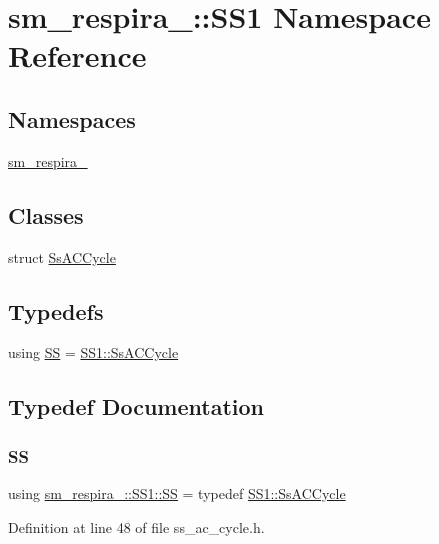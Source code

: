 \hypertarget{namespacesm__respira__1_1_1SS1}{}\section{sm\+\_\+respira\+\_\+:\+:S\+S1 Namespace Reference}
\label{namespacesm__respira__1_1_1SS1}
\subsection*{Namespaces}
\begin{DoxyCompactItemize}
\item 
 \hyperlink{namespacesm__respira__1_1_1SS1_1_1sm__respira__1}{sm\+\_\+respira\+\_}
\end{DoxyCompactItemize}
\subsection*{Classes}
\begin{DoxyCompactItemize}
\item 
struct \hyperlink{structsm__respira__1_1_1SS1_1_1SsACCycle}{Ss\+A\+C\+Cycle}
\end{DoxyCompactItemize}
\subsection*{Typedefs}
\begin{DoxyCompactItemize}
\item 
using \hyperlink{namespacesm__respira__1_1_1SS1_a0e01350d6b2d86177855e50b8a5731a4}{SS} = \hyperlink{structsm__respira__1_1_1SS1_1_1SsACCycle}{S\+S1\+::\+Ss\+A\+C\+Cycle}
\end{DoxyCompactItemize}


\subsection{Typedef Documentation}
\mbox{\label{namespacesm__respira__1_1_1SS1_a0e01350d6b2d86177855e50b8a5731a4}} 
\subsubsection{\texorpdfstring{SS}{SS}}
{\footnotesize\ttfamily using \hyperlink{namespacesm__respira__1_1_1SS1_a0e01350d6b2d86177855e50b8a5731a4}{sm\+\_\+respira\+\_\+::\+S\+S1\+::\+SS} = typedef \hyperlink{structsm__respira__1_1_1SS1_1_1SsACCycle}{S\+S1\+::\+Ss\+A\+C\+Cycle}}



Definition at line 48 of file ss\+\_\+ac\+\_\+cycle.\+h.

